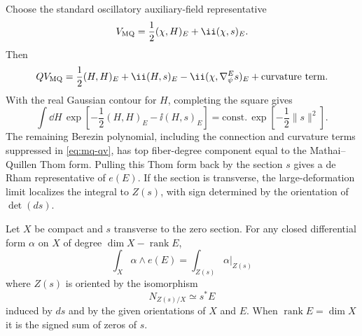 Choose the standard oscillatory auxiliary-field representative
\[
  V_{\rm MQ}
  =
  \frac12(\chi,H)_E+\ii(\chi,s)_E .
\]
Then
\begin{equation}
  QV_{\rm MQ}
  =
  \frac12(H,H)_E+\ii(H,s)_E
  -\ii(\chi,\nabla_\psi^E s)_E
  +\text{curvature term}.
  \label{eq:mq-qv}
\end{equation}
With the real Gaussian contour for \(H\), completing the square gives
\[
  \int \dd H\,
  \exp\left[-\frac12(H,H)_E-\ii(H,s)_E\right]
  =
  \text{const.}\,
  \exp\!\left[-\frac12\|s\|^2\right].
\]
The remaining Berezin polynomial, including the connection and curvature
terms suppressed in \eqref{eq:mq-qv}, has top fiber-degree component equal to the
Mathai--Quillen Thom form.  Pulling this Thom form back by the section
\(s\) gives a de Rham representative of \(e(E)\).  If the section is
transverse, the large-deformation limit localizes the integral to \(Z(s)\),
with sign determined by the orientation of \(\det(ds)\).

\begin{proposition}
\label{prop:mq-zero-locus-interpretation}
Let \(X\) be compact and \(s\) transverse to the zero section.  For any
closed differential form \(\alpha\) on \(X\) of degree
\(\dim X-\operatorname{rank}E\),
\[
  \int_X \alpha\wedge e(E)
  =
  \int_{Z(s)} \alpha|_{Z(s)}
  \]
where \(Z(s)\) is oriented by the isomorphism
\[
  N_{Z(s)/X}\simeq s^*E
\]
induced by \(ds\) and by the given orientations of \(X\) and \(E\).  When
\(\operatorname{rank}E=\dim X\) it is the signed sum of zeros of \(s\).
\end{proposition}

